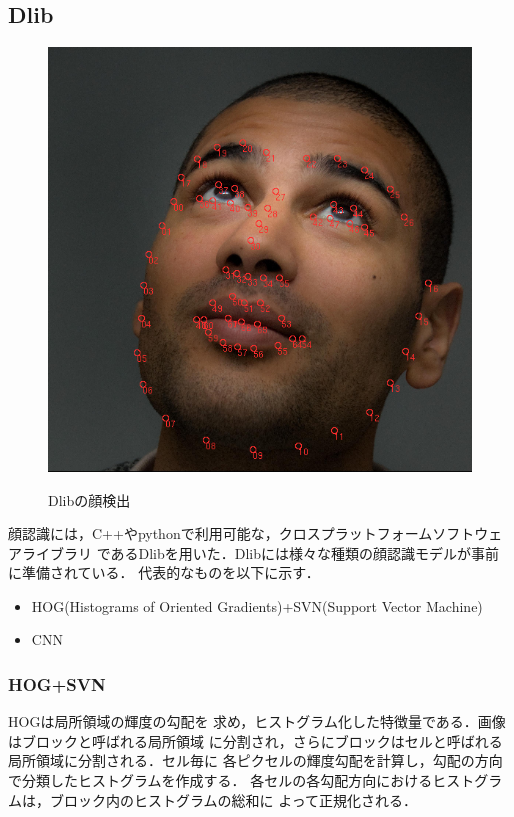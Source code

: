 \subsection*{Dlib}

\begin{figure}[tp]
  \centering
  \includegraphics[scale=0.7]{fig/dlib.png}
  \caption{Dlibの顔検出} \cite{13}
\end{figure}

顔認識には，C++やpythonで利用可能な，クロスプラットフォームソフトウェアライブラリ
であるDlibを用いた．Dlibには様々な種類の顔認識モデルが事前に準備されている．
代表的なものを以下に示す．
\begin{itemize}
  \item HOG(Histograms of Oriented Gradients)+SVN(Support Vector Machine)
  \item CNN
\end{itemize}

\subsubsection*{HOG+SVN}
HOGは局所領域の輝度の勾配を
求め，ヒストグラム化した特徴量である．画像はブロックと呼ばれる局所領域
に分割され，さらにブロックはセルと呼ばれる局所領域に分割される．セル毎に
各ピクセルの輝度勾配を計算し，勾配の方向で分類したヒストグラムを作成する．
各セルの各勾配方向におけるヒストグラムは，ブロック内のヒストグラムの総和に
よって正規化される．

